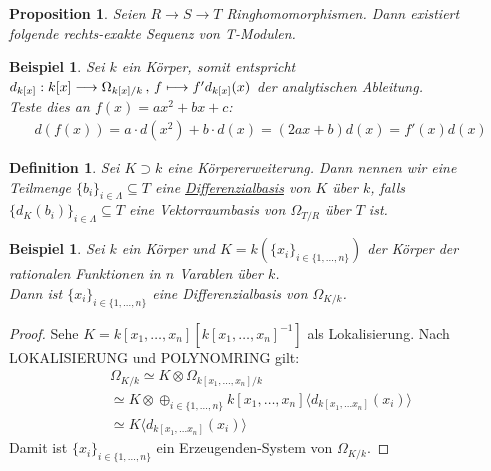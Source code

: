 \documentclass[10pt,a4paper]{report}
\newcommand{\comment}[1]{}
\newcounter{Aussage}[chapter]
\newtheorem{prop}[Aussage]{Proposition}
\newtheorem{definition}[Aussage]{Definition}
\newtheorem{bsp}[Aussage]{Beispiel}
\newcommand{\function}[5]{\nolinebreak{#1:#2 \longrightarrow #3 \, , \, #4 \longmapsto #5}}
\newcommand{\divR}[2]{\Omega_{#1/#2}}
\newcommand{\divf}[1]{d_{#1}}
\newcommand{\tensor}[3]{#1 \otimes #3}
\newcommand{\lok}[2]{#1 [#2^{-1}]}
\begin{document}
\begin{prop}\comment{\label{prof 16.2}}
Seien $R \longrightarrow S \longrightarrow T$ Ringhomomorphismen. Dann existiert folgende rechts-exakte Sequenz von T-Modulen.
\begin{center}
\end{center}

\end{prop}


\begin{bsp}\label{Ableitung ist Ableitung}
Sei $k$ ein Körper, somit entspricht $\function{\divf{k[x]}}{k[x]}{\divR{k[x]}{k}}{f}{f'\divf{k[x]}(x)}$ der analytischen Ableitung.\\
Teste dies an $f(x)=ax^2 + bx +c$:
\begin{gather*}
d(f(x)) = a \cdot d(x^2) + b \cdot d(x) = (2ax + b) d(x) = f'(x) d(x) 
\end{gather*}
\end{bsp}

\begin{definition}
Sei $K \supset k$ eine Körpererweiterung. Dann nennen wir eine Teilmenge $\lbrace b_i \rbrace_{i \in \Lambda} \subseteq T$ eine \underline{Differenzialbasis} von $K$ über $k$, falls $\lbrace \divf{K}(b_i)\rbrace_{i \in \Lambda} \subseteq T$ eine Vektorraumbasis von $\divR{T}{R}$ über $T$ ist.
\end{definition}

\begin{bsp}
Sei $k$ ein Körper und $K = k(\lbrace x_i \rbrace_{i \in \lbrace 1,\dots,n \rbrace})$ der Körper der rationalen Funktionen in $n$ Varablen über $k$.\\
Dann ist $\lbrace x_i \rbrace_{i \in \lbrace 1,\dots,n \rbrace}$ eine Differenzialbasis von $\divR{K}{k}$.
\end{bsp}
\begin{proof}
Sehe $K = \lok{k[x_1,\dots,x_n]}{k[x_1,\dots,x_n]}$ als Lokalisierung. Nach LOKALISIERUNG und POLYNOMRING gilt:
\begin{gather*}
\divR{K}{k} \simeq \tensor{K}{k[x_1,\dots,x_n]}{\divR{k[x_1,\dots,x_n]}{k}} \\
\simeq \tensor{K}{k[x_1,\dots,x_n]}{\oplus_{i \in \lbrace 1,\dots,n \rbrace} k[x_1,\dots,x_n]\langle \divf{k[x_1,\dots x_n]}(x_i) \rangle} \\
\simeq K\langle \divf{k[x_1,\dots x_n]}(x_i) \rangle
\end{gather*}
Damit ist $\lbrace x_i \rbrace_{i \in \lbrace 1,\dots,n \rbrace}$ ein Erzeugenden-System von $\divR{K}{k}$.
\end{proof}
\end{document}
